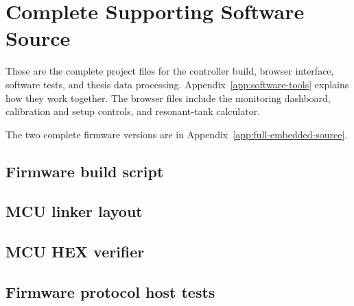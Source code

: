 \chapter{Complete Supporting Software Source}
\label{app:full-supporting-source}

These are the complete project files for the controller build,
browser interface, software tests, and thesis data processing.
Appendix~\ref{app:software-tools} explains how they work together.
The browser files include the monitoring dashboard, calibration and setup controls, and resonant-tank calculator.

The two complete firmware versions are in Appendix~\ref{app:full-embedded-source}.

\section{Firmware build script}




\section{MCU linker layout}




\section{MCU HEX verifier}




\section{Firmware protocol host tests}




